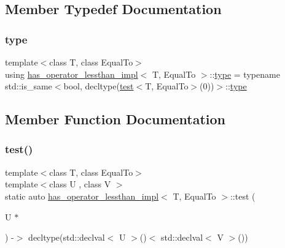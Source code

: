 \subsection{Member Typedef Documentation}
\mbox{\label{structhas__operator__lessthan__impl_a94158125949ce4db0eefedbdc4cbad73}} 
\subsubsection{\texorpdfstring{type}{type}}
{\footnotesize\ttfamily template$<$class T, class Equal\+To$>$ \\
using \hyperlink{structhas__operator__lessthan__impl}{has\+\_\+operator\+\_\+lessthan\+\_\+impl}$<$ T, Equal\+To $>$\+::\hyperlink{structhas__operator__lessthan__impl_a94158125949ce4db0eefedbdc4cbad73}{type} =  typename std\+::is\+\_\+same$<$bool, decltype(\hyperlink{structhas__operator__lessthan__impl_a5eee8607153dcb4ac5ed91df37251062}{test}$<$T, Equal\+To$>$(0))$>$\+::\hyperlink{structhas__operator__lessthan__impl_a94158125949ce4db0eefedbdc4cbad73}{type}}



\subsection{Member Function Documentation}
\mbox{\label{structhas__operator__lessthan__impl_a5eee8607153dcb4ac5ed91df37251062}} 
\subsubsection{\texorpdfstring{test()}{test()}\hspace{0.1cm}{\footnotesize\ttfamily [1/2]}}
{\footnotesize\ttfamily template$<$class T, class Equal\+To$>$ \\
template$<$class U , class V $>$ \\
static auto \hyperlink{structhas__operator__lessthan__impl}{has\+\_\+operator\+\_\+lessthan\+\_\+impl}$<$ T, Equal\+To $>$\+::test (\begin{DoxyParamCaption}\item[{U $\ast$}]{ }\end{DoxyParamCaption}) -\/$>$  decltype(std\+::declval$<$ U $>$()$<$ std\+::declval$<$ V $>$())\hspace{0.3cm}{\ttfamily [static]}}

